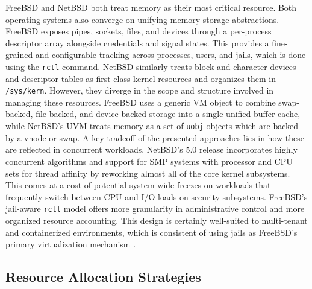 FreeBSD and NetBSD both treat memory as their most critical resource. Both operating systems also converge on unifying
memory storage abstractions. FreeBSD exposes
pipes, sockets, files, and devices through a per-process descriptor array alongside credentials and signal states.
This provides a fine-grained and configurable tracking across processes, users, and jails, which is done using the
\texttt{rctl} command. NetBSD similarly treats block and character devices and descriptor tables as first-class kernel
resources and organizes them in \texttt{/sys/kern}. However, they diverge in the scope and structure involved in
managing these resources. FreeBSD uses a generic VM object to combine swap-backed, file-backed, and device-backed storage
into a single unified buffer cache, while NetBSD's UVM treats memory as a set of \texttt{uobj} objects which are backed
by a vnode or swap. A key tradeoff of the presented approaches lies in how these are reflected in concurrent workloads.
NetBSD's 5.0 release incorporates highly concurrent algorithms and support for SMP systems with processor and CPU sets
for thread affinity by reworking almost all of the core kernel subsystems. This comes at a cost of potential system-wide
freezes on workloads that frequently switch between CPU and I/O loads on security subsystems. FreeBSD's jail-aware
\texttt{rctl} model offers more granularity in administrative control and more organized resource accounting. This design
is certainly well-suited to multi-tenant and containerized environments, which is consistent of using jails as FreeBSD's
primary virtualization mechanism \parencite{freebsd_jails}.

\subsection{Resource Allocation Strategies} \label{resource-allocation-strats} %

